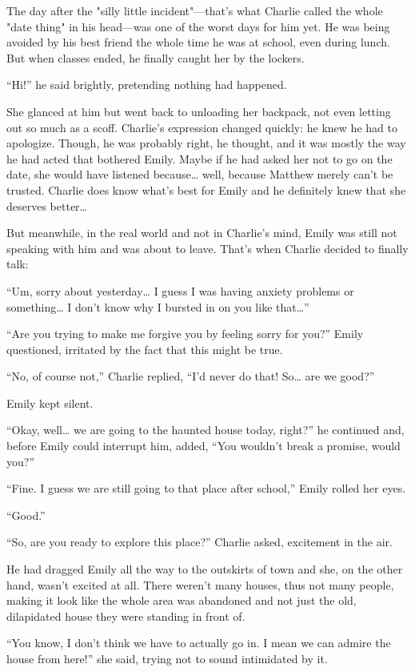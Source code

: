 The day after the "silly little incident"—that’s what Charlie called the whole "date thing" in his head—was one of the worst days for him yet. He was being avoided by his best friend the whole time he was at school, even during lunch. But when classes ended, he finally caught her by the lockers.

“Hi!” he said brightly, pretending nothing had happened.

She glanced at him but went back to unloading her backpack, not even letting out so much as a scoff. Charlie’s expression changed quickly: he knew he had to apologize. Though, he was probably right, he thought, and it was mostly the way he had acted that bothered Emily. Maybe if he had asked her not to go on the date, she would have listened because… well, because Matthew merely can’t be trusted. Charlie does know what’s best for Emily and he definitely knew that she deserves better…

But meanwhile, in the real world and not in Charlie’s mind, Emily was still not speaking with him and was about to leave. That’s when Charlie decided to finally talk:

“Um, sorry about yesterday… I guess I was having anxiety problems or something… I don’t know why I bursted in on you like that…”

“Are you trying to make me forgive you by feeling sorry for you?” Emily questioned, irritated by the fact that this might be true.

“No, of course not,” Charlie replied, “I’d never do that! So… are we good?”

Emily kept silent.

“Okay, well… we are going to the haunted house today, right?” he continued and, before Emily could interrupt him, added, “You wouldn’t break a promise, would you?”

“Fine. I guess we are still going to that place after school,” Emily rolled her eyes.

“Good.”

\bigskip

“So, are you ready to explore this place?” Charlie asked, excitement in the air.

He had dragged Emily all the way to the outskirts of town and she, on the other hand, wasn’t excited at all. There weren’t many houses, thus not many people, making it look like the whole area was abandoned and not just the old, dilapidated house they were standing in front of.

“You know, I don’t think we have to actually go in. I mean we can admire the house from here!” she said, trying not to sound intimidated by it.


